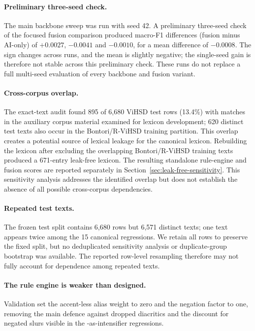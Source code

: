 \paragraph{Preliminary three-seed check.}
The main backbone sweep was run with seed 42. A preliminary three-seed check of
the focused fusion comparison produced macro-F1 differences (fusion minus
AI-only) of $+0.0027$, $-0.0041$ and $-0.0010$, for a mean difference of
$-0.0008$. The sign changes across runs, and the mean is slightly negative; the
single-seed gain is therefore not stable across this preliminary check. These
runs do not replace a full multi-seed evaluation of every backbone and fusion
variant.

\paragraph{Cross-corpus overlap.}
The exact-text audit found 895 of 6{,}680 ViHSD test rows (13.4\%) with matches
in the auxiliary corpus material examined for lexicon development; 620 distinct
test texts also occur in the Bontori/R-ViHSD training partition. This overlap
creates a potential source of lexical leakage for the canonical lexicon.
Rebuilding the lexicon after excluding the overlapping Bontori/R-ViHSD training
texts produced a 671-entry leak-free lexicon. The resulting standalone
rule-engine and fusion scores are reported separately in
Section~\ref{sec:leak-free-sensitivity}. This sensitivity analysis addresses
the identified overlap but does not establish the absence of all possible
cross-corpus dependencies.

\paragraph{Repeated test texts.}
The frozen test split contains 6{,}680 rows but 6{,}571 distinct texts; one
text appears twice among the 15 canonical regressions. We retain all rows to
preserve the fixed split, but no deduplicated sensitivity analysis or
duplicate-group bootstrap was available. The reported row-level resampling
therefore may not fully account for dependence among repeated texts.

\paragraph{The rule engine is weaker than designed.}
Validation set the accent-less alias weight to zero and the negation factor to
one, removing the main defence against dropped diacritics and the discount for
negated slurs visible in the \off{}-as-intensifier regressions.

